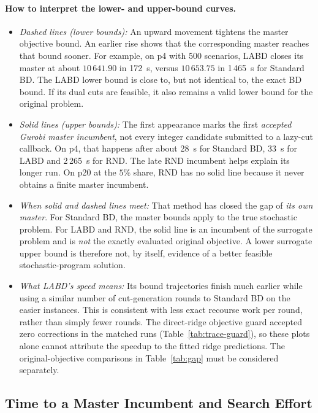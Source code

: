 \paragraph{How to interpret the lower- and upper-bound curves.}
\begin{itemize}
\item \emph{Dashed lines (lower bounds):} An upward movement tightens the master objective bound. An earlier rise shows that the corresponding master reaches that bound sooner. For example, on p4 with 500 scenarios, LABD closes its master at about $10\,641.90$ in 172~s, versus $10\,653.75$ in 1\,465~s for Standard BD. The LABD lower bound is close to, but not identical to, the exact BD bound. If its dual cuts are feasible, it also remains a valid lower bound for the original problem.
\item \emph{Solid lines (upper bounds):} The first appearance marks the first \emph{accepted Gurobi master incumbent}, not every integer candidate submitted to a lazy-cut callback. On p4, that happens after about 28~s for Standard BD, 33~s for LABD and 2\,265~s for RND. The late RND incumbent helps explain its longer run. On p20 at the $5\%$ share, RND has no solid line because it never obtains a finite master incumbent.
\item \emph{When solid and dashed lines meet:} That method has closed the gap of \emph{its own master}. For Standard BD, the master bounds apply to the true stochastic problem. For LABD and RND, the solid line is an incumbent of the surrogate problem and is \emph{not} the exactly evaluated original objective. A lower surrogate upper bound is therefore not, by itself, evidence of a better feasible stochastic-program solution.
\item \emph{What LABD's speed means:} Its bound trajectories finish much earlier while using a similar number of cut-generation rounds to Standard BD on the easier instances. This is consistent with less exact recourse work per round, rather than simply fewer rounds. The direct-ridge objective guard accepted zero corrections in the matched runs (Table~\ref{tab:trace-guard}), so these plots alone cannot attribute the speedup to the fitted ridge predictions. The original-objective comparisons in Table~\ref{tab:gap} must be considered separately.
\end{itemize}

\clearpage

\subsection{Time to a Master Incumbent and Search Effort}\label{app:trace-incumbents}

